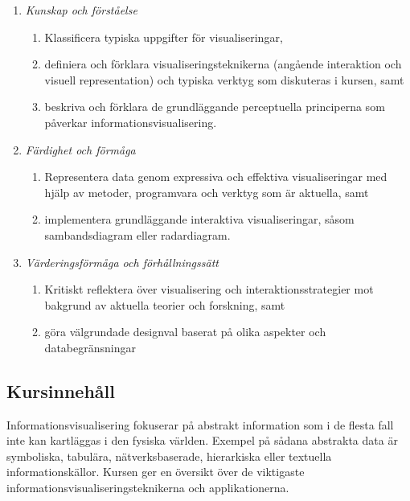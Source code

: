 \begin{enumerate}
\def\labelenumi{\Alph{enumi}.}
\tightlist
\item
  \emph{Kunskap och förståelse}

  \begin{enumerate}
  \def\labelenumii{\Alph{enumi}.\arabic{enumii}.}
  \tightlist
  \item
    Klassificera typiska uppgifter för visualiseringar,
  \item
    definiera och förklara visualiseringsteknikerna (angående
    interaktion och visuell representation) och typiska verktyg som
    diskuteras i kursen, samt
  \item
    beskriva och förklara de grundläggande perceptuella principerna som
    påverkar informationsvisualisering.
  \end{enumerate}
\item
  \emph{Färdighet och förmåga}

  \begin{enumerate}
  \def\labelenumii{\Alph{enumi}.\arabic{enumii}.}
  \tightlist
  \item
    Representera data genom expressiva och effektiva visualiseringar med
    hjälp av metoder, programvara och verktyg som är aktuella, samt
  \item
    implementera grundläggande interaktiva visualiseringar, såsom
    sambandsdiagram eller radardiagram.
  \end{enumerate}
\item
  \emph{Värderingsförmåga och förhållningssätt}

  \begin{enumerate}
  \def\labelenumii{\Alph{enumi}.\arabic{enumii}.}
  \tightlist
  \item
    Kritiskt reflektera över visualisering och interaktionsstrategier
    mot bakgrund av aktuella teorier och forskning, samt
  \item
    göra välgrundade designval baserat på olika aspekter och
    databegränsningar
  \end{enumerate}
\end{enumerate}

\subsection*{Kursinnehåll}

Informationsvisualisering fokuserar på abstrakt information som i de
flesta fall inte kan kartläggas i den fysiska världen. Exempel på sådana
abstrakta data är symboliska, tabulära, nätverksbaserade, hierarkiska
eller textuella informationskällor. Kursen ger en översikt över de
viktigaste informationsvisualiseringsteknikerna och applikationerna.

